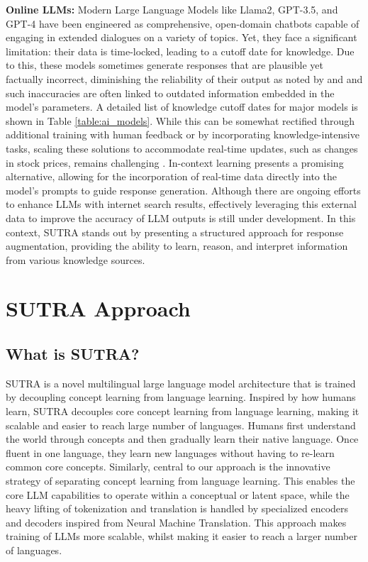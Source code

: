 \documentclass{article}
\begin{document}
\vspace{4mm}
\textbf{Online LLMs:} Modern Large Language Models like Llama2, GPT-3.5, and GPT-4 have been engineered as comprehensive, open-domain chatbots capable of engaging in extended dialogues on a variety of topics. Yet, they face a significant limitation: their data is time-locked, leading to a cutoff date for knowledge. Due to this, these models sometimes generate responses that are plausible yet factually incorrect, diminishing the reliability of their output as noted by \citet{vu2023freshllms} and \citet{press2022measuring} and such inaccuracies are often linked to outdated information embedded in the model's parameters. A detailed list of knowledge cutoff dates for major models is shown in Table \ref{table:ai_models}. While this can be somewhat rectified through additional training with human feedback or by incorporating knowledge-intensive tasks, scaling these solutions to accommodate real-time updates, such as changes in stock prices, remains challenging \citet{komeili2021internet}. In-context learning presents a promising alternative, allowing for the incorporation of real-time data directly into the model's prompts to guide response generation. Although there are ongoing efforts to enhance LLMs with internet search results, effectively leveraging this external data to improve the accuracy of LLM outputs is still under development. In this context, SUTRA stands out by presenting a structured approach for response augmentation, providing the ability to learn, reason, and interpret information from various knowledge sources.



\section{SUTRA Approach}

\subsection{What is SUTRA?}
SUTRA is a novel multilingual large language model architecture that is trained by decoupling concept learning from language learning.
Inspired by how humans learn, SUTRA decouples core concept learning from language learning, making it scalable and easier to reach large number of languages.
Humans first understand the world through concepts and then gradually learn their native language.
Once fluent in one language, they learn new languages without having to re-learn common core concepts.
Similarly, central to our approach is the innovative strategy of separating concept learning from language learning.
This enables the core LLM capabilities to operate within a conceptual or latent space, while the heavy lifting of tokenization and translation is handled by specialized encoders and decoders inspired from Neural Machine Translation.
This approach makes training of LLMs more scalable, whilst making it easier to reach a larger number of languages.
\end{document}
